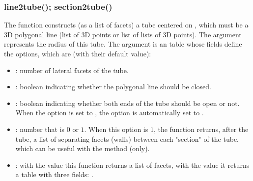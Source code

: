 \subsubsection{line2tube(); section2tube()}

The function  constructs (as a list of facets) a tube centered on , which must be a 3D polygonal line (list of 3D points or list of lists of 3D points). The argument  represents the radius of this tube. The argument  is an table whose fields define the options, which are (with their default value):
\begin{itemize}
    \item {}: number of lateral facets of the tube.
    
    \item {}: boolean indicating whether the polygonal line should be closed.
    
    \item {}: boolean indicating whether both ends of the tube should be open or not. When the  option is set to \true, the  option is automatically set to \true. 
          
    \item {}: number that is $0$ or $1$. When this option is $1$, the function returns, after the  tube, a list of separating facets (walls) between each "section" of the tube, which can be useful with the  method (only).
    
    \item {} : with the value \false this function returns a list of facets, with the value \true it returns a table with three fields: .    
\end{itemize}


